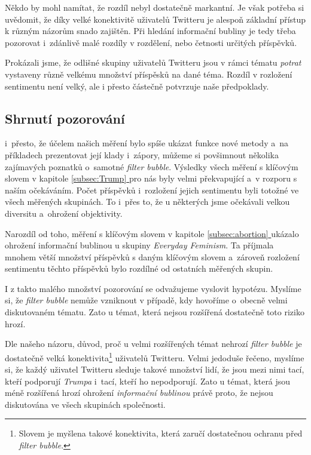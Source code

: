 \documentclass[12pt, a4paper]{article}
\newcommand*{\fullref}[1]{\hyperref[{#1}]{\ref*{#1} \nameref*{#1}}} %
\numberwithin{equation}{section} 	%
\begin{document}
Někdo by mohl namítat, že rozdíl nebyl dostatečně markantní. Je však potřeba si uvědomit, že díky velké konektivitě uživatelů Twitteru je alespoň základní přístup k různým názorům snado zajištěn. Při hledání informační bubliny je tedy třeba pozorovat i~zdánlivě malé rozdíly v rozdělení, nebo četnosti určitých příspěvků.

Prokázali jsme, že odlišné skupiny uživatelů Twitteru jsou v rámci tématu \textit{potrat} vystaveny různě velkému množství příspěsků na dané téma. Rozdíl v rozložení sentimentu není velký, ale i přesto částečně potvrzuje naše předpoklady.


\subsection{Shrnutí pozorování}
\noindent i~přesto, že účelem našich měření bylo spíše ukázat funkce nové metody a~na příkladech prezentovat její klady i~zápory, můžeme si povšimnout několika za\-jí\-ma\-vých poznatků o~samotné \textit{filter bubble}. Výsledky všech měření s klíčovým slovem \textit{} v kapitole \fullref{subsec:Trump} pro nás byly velmi překvapující a~v rozporu s naším očekáváním. Počet příspěvků i~rozložení jejich sentimentu byli totožné ve všech měřených skupinách. To i~přes to, že u některých jsme očekávali velkou diversitu a~ohrožení objektivity.

Narozdíl od toho, měření s klíčovým slovem \textit{} v kapitole \fullref{subsec:abortion} ukázalo ohrožení informační bublinou u skupiny \textit{Everyday Feminism}. Ta příjmala mnohem větší množství příspěvků s daným klíčovým slovem a~zároveň rozložení sentimentu těchto příspěvků bylo rozdílné od ostatních měřených skupin.

I z takto malého množství pozorování se odvažujeme vyslovit hypotézu. My\-slí\-me si, že \textit{filter bubble} nemůže vzniknout v případě, kdy hovoříme o~obecně velmi diskutovaném tématu. Zato u témat, která nejsou rozšířená dostatečně toto riziko hrozí.

Dle našeho názoru, důvod, proč u velmi rozšířených témat nehrozí \textit{filter bubble} je dostatečně velká konektivita\footnote{Slovem \textit{} je myšlena takové konektivita, která zaručí dostatečnou ochranu před \textit{filter bubble}.} uživatelů Twitteru. Velmi jedoduše řečeno, my\-slí\-me si, že každý uživatel Twitteru sleduje takové množství lidí, že jsou mezi nimi tací, kteří podporují \textit{Trumpa} i~tací, kteří ho nepodporují. Zato u témat, která jsou méně rozšířená hrozí ohrožení \textit{informační bublinou} právě proto, že nejsou diskutována ve všech skupinách společnosti.
\end{document}
